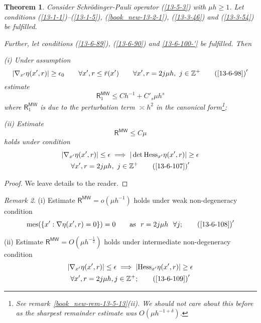 \documentclass[12pt,oneside,openany,article]{memoir}
\numberwithin{equation}{chapter}
\theoremstyle{plain}
\newtheorem{theorem}{Theorem}[chapter]
\theoremstyle{definition}
\theoremstyle{remark}
\newtheorem{remark}[theorem]{Remark}
\numberwithin{equation}{chapter}
\newcounter{note}
\begin{document}
\begin{theorem}\label{thm-13-6-37}
Consider Schr\"odinger-Pauli operator \textup{(\ref{13-5-3})} with $\mu h\ge 1$. 
Let conditions \textup{(\ref{13-1-1})}--\textup{(\ref{13-1-5})}, \textup{(\ref{book_new-13-2-1})}, \textup{(\ref{13-3-46})} and \textup{(\ref{13-3-54})} be fulfilled.

Further, let conditions \textup{(\ref{13-6-89})},  \textup{(\ref{13-6-90})} and \ref{13-6-100-'} be fulfilled. Then

\medskip\noindent
(i) Under assumption
\begin{equation}
|\nabla_{x'} \eta (x',r)|\ge \epsilon_0 \qquad
\forall x', r\le \bar{r}(x')\qquad  \forall x', r=2j\mu h,\  j\in {{\mathbb{Z}}}^+
\tag*{$\textup{(\ref*{13-6-98})}'$}\label{13-6-98-'}
\end{equation}
estimate 
\begin{equation}
{{\mathsf{R}}}^{{\mathsf{MW}}}_1 \le C h^{-1} +C'_s \mu h^s
\label{13-6-115}
\end{equation}
where ${{\mathsf{R}}}^{{\mathsf{MW}}}_1$ is due to the perturbation term $\asymp h^2$ in the canonical form\footnote{\label{foot-13-45} See remark~\ref{book_new-rem-13-5-13}(ii). We should not care about this before as the sharpest remainder estimate was $O(\mu h^{-1+\delta})$.};

\medskip\noindent
(ii) Estimate
\begin{equation}
{{\mathsf{R}}}^{{\mathsf{MW}}}  \le C \mu 
\label{13-6-116}
\end{equation}
holds under condition 
\begin{multline}
|\nabla_{x'} \eta (x',r)|\le \epsilon \implies |\det {\operatorname{Hess}}_{x'} \eta (x',r) |\ge \epsilon \\
\forall x', r=2j\mu h,\  j\in {{\mathbb{Z}}}^+
\tag*{$\textup{(\ref*{13-6-107})}'$}\label{13-6-107-'}
\end{multline}
\end{theorem}

\begin{proof}
We leave details to the reader.
\end{proof}

\begin{remark}\label{rem-13-6-38}
(i) Estimate ${{\mathsf{R}}}^{{\mathsf{MW}}} =o(\mu h^{-1})$ holds  under weak non-degeneracy condition
\begin{equation}
{\operatorname{mes}} (\{x': \nabla \eta (x', r) =0\})=0\qquad \text{as\ \ }r=2j\mu h\ \ \forall j;
\tag*{$\textup{(\ref*{13-6-108})}'$}\label{13-6-108-'}
\end{equation}

\medskip\noindent
(ii) Estimate ${{\mathsf{R}}}^{{\mathsf{MW}}}=O(\mu h^{-\frac{1}{2}})$ holds under intermediate non-degeneracy condition
\begin{multline}
|\nabla_{x'} \eta (x', r)  |\le \epsilon \implies | {\operatorname{Hess}}_{x'} \eta (x',r) |\ge \epsilon \\
\forall x', r=2j\mu h, j\in {{\mathbb{Z}}}^+;
\tag*{$\textup{(\ref*{13-6-109})}'$}\label{13-6-109-'}
\end{multline}
\end{remark}
\end{document}
